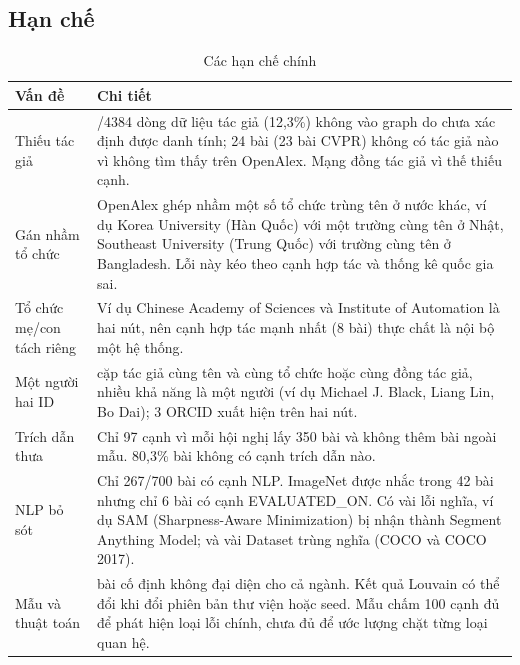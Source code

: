 \documentclass[11pt,a4paper]{article}
\begin{document}
\subsection{Hạn chế}
\begin{table}[H]
\small\centering
\renewcommand{\arraystretch}{1.25}
\caption{Các hạn chế chính}
\label{tab:hanche}
\begin{tabularx}{\textwidth}{@{}>{\raggedright\arraybackslash}p{3.2cm} >{\raggedright\arraybackslash}X@{}}
\toprule
\textbf{Vấn đề} & \textbf{Chi tiết}\\
\midrule
Thiếu tác giả & 539/4384 dòng dữ liệu tác giả (12,3\%) không vào graph do chưa xác định được danh tính; 24 bài (23 bài CVPR) không có tác giả nào vì không tìm thấy trên OpenAlex. Mạng đồng tác giả vì thế thiếu cạnh.\\
Gán nhầm tổ chức & OpenAlex ghép nhầm một số tổ chức trùng tên ở nước khác, ví dụ Korea University (Hàn Quốc) với một trường cùng tên ở Nhật, Southeast University (Trung Quốc) với trường cùng tên ở Bangladesh. Lỗi này kéo theo cạnh hợp tác và thống kê quốc gia sai.\\
Tổ chức mẹ/con tách riêng & Ví dụ Chinese Academy of Sciences và Institute of Automation là hai nút, nên cạnh hợp tác mạnh nhất (8 bài) thực chất là nội bộ một hệ thống.\\
Một người hai ID & 38 cặp tác giả cùng tên và cùng tổ chức hoặc cùng đồng tác giả, nhiều khả năng là một người (ví dụ Michael J. Black, Liang Lin, Bo Dai); 3 ORCID xuất hiện trên hai nút.\\
Trích dẫn thưa & Chỉ 97 cạnh vì mỗi hội nghị lấy 350 bài và không thêm bài ngoài mẫu. 80,3\% bài không có cạnh trích dẫn nào.\\
NLP bỏ sót & Chỉ 267/700 bài có cạnh NLP. ImageNet được nhắc trong 42 bài nhưng chỉ 6 bài có cạnh EVALUATED\_ON. Có vài lỗi nghĩa, ví dụ SAM (Sharpness-Aware Minimization) bị nhận thành Segment Anything Model; và vài Dataset trùng nghĩa (COCO và COCO 2017).\\
Mẫu và thuật toán & 700 bài cố định không đại diện cho cả ngành. Kết quả Louvain có thể đổi khi đổi phiên bản thư viện hoặc seed. Mẫu chấm 100 cạnh đủ để phát hiện loại lỗi chính, chưa đủ để ước lượng chặt từng loại quan hệ.\\
\bottomrule
\end{tabularx}
\end{table}
\end{document}
